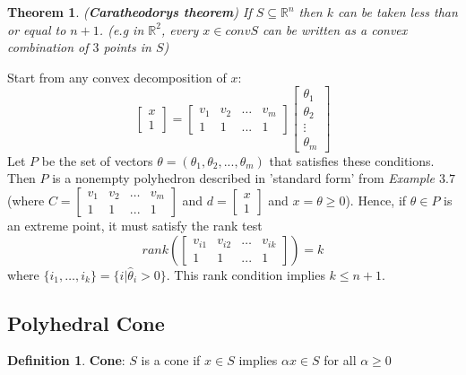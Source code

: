 \documentclass[10pt]{article}
\def\red#1{{\color{red}#1}}
\def\R{\mathbb{R}}
\def\a{\alpha}
\newtheorem{thm}{Theorem}[section]
\theoremstyle{definition}
\newtheorem{defn}{Definition}[section]
\begin{document}
\begin{thm}
	(\textbf{Caratheodorys theorem}) If $S \subseteq \R^n$ then $k$ can be taken less than or equal to $n+1$.
	(e.g in $\R^2$, every $x \in convS$ can be written as a convex combination of $3$ points in $S$)
\end{thm}
\proof Start from any convex decomposition of $x$:
\begin{equation*}
	\begin{bmatrix}
		x \\ 1
	\end{bmatrix} =
	\begin{bmatrix}
		v_1 & v_2 & \dots & v_m \\ 1 & 1 & ... & 1
	\end{bmatrix}
	\begin{bmatrix}
		\theta_1 \\ \theta_2 \\ \vdots \\ \theta_m
	\end{bmatrix}
\end{equation*}
Let $P$ be the set of vectors $\theta = (\theta_1, \theta_2, ..., \theta_m)$ that satisfies these conditions.
Then $P$ is a nonempty polyhedron described in 'standard form' from \textit{Example $3.7$}
(where $C = \begin{bmatrix}
	v_1 & v_2 & \dots & v_m \\ 1 & 1 & ... & 1
\end{bmatrix}$ and
$d = \begin{bmatrix}
	x \\ 1
\end{bmatrix}$ and
$x = \theta \ge 0$). Hence, if $\hat{\theta} \in P$ is an extreme point, it must satisfy the rank test
\begin{equation*}
	rank(\begin{bmatrix}v_{i1} & v_{i2} & \dots & v_{ik} \\ 1 & 1 & ... & 1\end{bmatrix}) = k
\end{equation*}
where $\{i_1, \dots, i_k\} = \{i | \hat{\theta}_{i} > 0\}$. \red{This rank condition implies $k \le n+1$.}

\subsection{Polyhedral Cone}

\begin{defn} \textbf{Cone}:
	$S$ is a cone if $x \in S$ implies $\a x \in S$ for all $\a \ge 0$
\end{defn}
\end{document}
